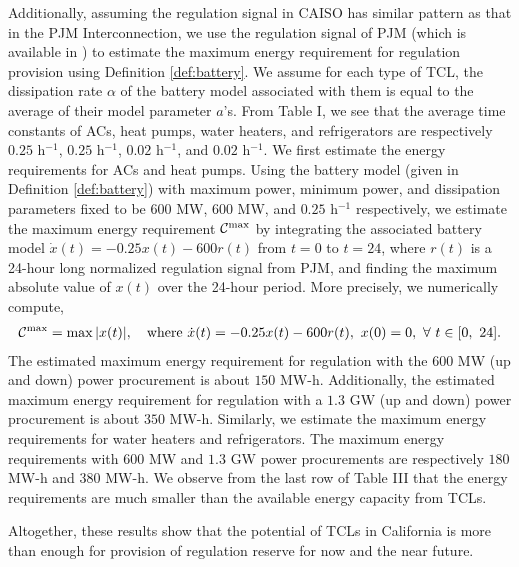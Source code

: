 \documentclass[onecolumn,journal]{IEEEtran}
\begin{document}
Additionally, assuming the regulation signal in \ac{CAISO} has similar pattern as that in the \ac{PJM} Interconnection, we use the regulation signal of \ac{PJM} (which is available in \cite{PJM}) to estimate the maximum energy requirement for regulation provision using Definition \ref{def:battery}. We assume for each type of \ac{TCL}, the dissipation rate $\alpha$ of the battery model associated with them is equal to the average of their model parameter $a$'s. From Table I, we see that  the average time constants of ACs, heat pumps, water heaters, and refrigerators are respectively $0.25$ h$^{-1}$, $0.25$ h$^{-1}$, $0.02$ h$^{-1}$, and $0.02$ h$^{-1}$. We first estimate the energy requirements for ACs and heat pumps. Using the battery model (given in Definition \ref{def:battery}) with maximum power, minimum power, and dissipation parameters fixed to be $600$ MW, $600$ MW, and $0.25$ h$^{-1}$ respectively, we estimate the maximum energy requirement $\mathcal{C}^{\rm max}$ by integrating the associated battery model $ \dot{x}(t) = -0.25 x(t) -  600r(t)$  from $t=0$ to $t=24$, where $r(t)$ is a 24-hour long normalized regulation signal from PJM, and finding the maximum absolute value of $x(t)$ over the 24-hour period. More precisely, we numerically compute,
\begin{align*}
\mathcal{C}^{\rm max}  =  \max |x(t)|,  \quad \text{where} \ \dot{x}(t) = -0.25 x(t) - 600 r(t), \ x(0)=0, \ \forall \ t \in [0,\ 24]. 
\end{align*}
The estimated maximum energy requirement for regulation with the $600$ MW (up and down) power procurement is about $150$ MW-h. Additionally, the estimated maximum energy requirement for regulation with a $1.3$ GW (up and down) power procurement is about $350$ MW-h. Similarly, we estimate the maximum energy requirements for water heaters and refrigerators. The maximum energy requirements with $600$ MW and $1.3$ GW power procurements are respectively $180$ MW-h and $380$ MW-h. We observe from the last row of Table III that the energy requirements are much smaller than the available energy capacity from \acp{TCL}. 


Altogether, these results show that the potential of \acp{TCL} in California is more than enough for provision of regulation reserve for now and the near future. 
\end{document}
